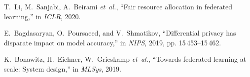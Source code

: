 \documentclass[11pt]{article}
\begin{document}
\begin{thebibliography}{10}
\begin{small}
		T.~Li, M.~Sanjabi, A.~Beirami \emph{et~al.}, ``Fair resource allocation in
		federated learning,'' in \emph{ICLR}, 2020.
		
		E.~Bagdasaryan, O.~Poursaeed, and V.~Shmatikov, ``Differential privacy has
		disparate impact on model accuracy,'' in \emph{NIPS}, 2019, pp.
		15\,453--15\,462.
		
		K.~Bonawitz, H.~Eichner, W.~Grieskamp \emph{et~al.}, ``Towards federated
		learning at scale: System design,'' in \emph{MLSys}, 2019.
		
		
		
	\end{small}
\end{thebibliography}
\end{document}
